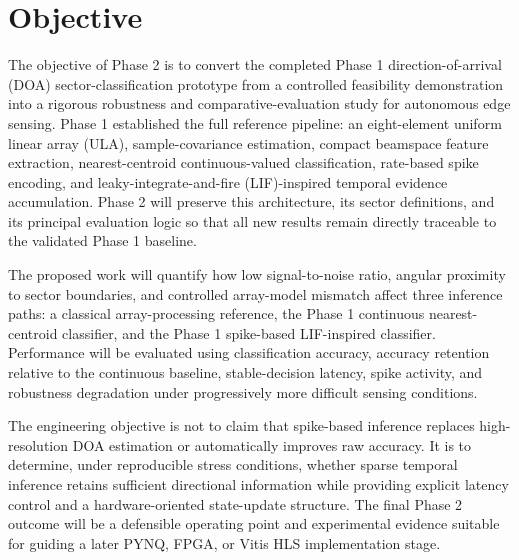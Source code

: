 \chapter*{Objective}

The objective of Phase 2 is to convert the completed Phase 1 direction-of-arrival (DOA) sector-classification prototype from a controlled feasibility demonstration into a rigorous robustness and comparative-evaluation study for autonomous edge sensing. Phase 1 established the full reference pipeline: an eight-element uniform linear array (ULA), sample-covariance estimation, compact beamspace feature extraction, nearest-centroid continuous-valued classification, rate-based spike encoding, and leaky-integrate-and-fire (LIF)-inspired temporal evidence accumulation. Phase 2 will preserve this architecture, its sector definitions, and its principal evaluation logic so that all new results remain directly traceable to the validated Phase 1 baseline.

The proposed work will quantify how low signal-to-noise ratio, angular proximity to sector boundaries, and controlled array-model mismatch affect three inference paths: a classical array-processing reference, the Phase 1 continuous nearest-centroid classifier, and the Phase 1 spike-based LIF-inspired classifier. Performance will be evaluated using classification accuracy, accuracy retention relative to the continuous baseline, stable-decision latency, spike activity, and robustness degradation under progressively more difficult sensing conditions.

The engineering objective is not to claim that spike-based inference replaces high-resolution DOA estimation or automatically improves raw accuracy. It is to determine, under reproducible stress conditions, whether sparse temporal inference retains sufficient directional information while providing explicit latency control and a hardware-oriented state-update structure. The final Phase 2 outcome will be a defensible operating point and experimental evidence suitable for guiding a later PYNQ, FPGA, or Vitis HLS implementation stage.